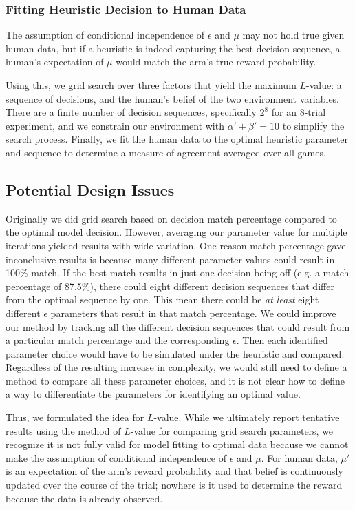\subsubsection{Fitting Heuristic Decision to Human Data}
The assumption of conditional independence of $\epsilon$ and $\mu$ may not hold true given human data, but if a heuristic is indeed capturing the best decision sequence, a human's expectation of $\mu$ would match the arm's true reward probability.

Using this, we grid search over three factors that yield the maximum $L$-value: a sequence of decisions, and the human's belief of the two environment variables. There are a finite number of decision sequences, specifically $2^8$ for an 8-trial experiment, and we constrain our environment with $\alpha'+\beta'=10$ to simplify the search process. Finally, we fit the human data to the optimal heuristic parameter and sequence to determine a measure of agreement averaged over all games.

\subsection{Potential Design Issues}
Originally we did grid search based on decision match percentage compared to the optimal model decision. However, averaging our parameter value for multiple iterations yielded results with wide variation. One reason match percentage gave inconclusive results is because many different parameter values could result in 100\% match. If the best match results in just one decision being off (e.g. a match percentage of 87.5\%), there could eight different decision sequences that differ from the optimal sequence by one. This mean there could be \textit{at least} eight different $\epsilon$ parameters that result in that match percentage. We could improve our method by tracking all the different decision sequences that could result from a particular match percentage and the corresponding $\epsilon$. Then each identified parameter choice would have to be simulated under the heuristic and compared. Regardless of the resulting increase in complexity, we would still need to define a method to compare all these parameter choices, and it is not clear how to define a way to differentiate the parameters for identifying an optimal value.

Thus, we formulated the idea for $L$-value. While we ultimately report tentative results using the method of $L$-value for comparing grid search parameters, we recognize it is not fully valid for model fitting to optimal data because we cannot make the assumption of conditional independence of $\epsilon$ and $\mu$. For human data, $\mu'$ is an expectation of the arm's reward probability and that belief is continuously updated over the course of the trial; nowhere is it used to determine the reward because the data is already observed.

